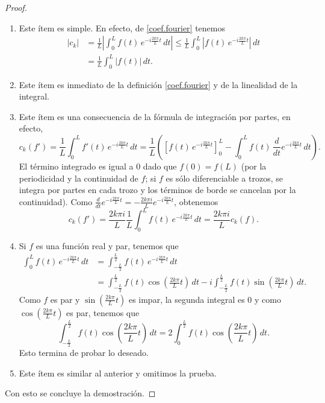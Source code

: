 \documentclass[12pt, a4paper]{amsbook}
\theoremstyle{remark}
\theoremstyle{definition}
\numberwithin{section}{chapter}
\numberwithin{subsection}{section}
\numberwithin{equation}{section}
\numberwithin{figure}{chapter}
\begin{document}
\begin{proof}
\begin{enumerate}
\item Este ítem es simple. En efecto, de \eqref{coef.fourier} tenemos
\begin{align*}
|c_k| &= \frac{1}{L}\left|\int_0^L f(t)\, e^{-i\frac{2k\pi}{L}t}\, dt \right|\le\frac{1}{L}\int_0^L \left|f(t)\, e^{-i\frac{2k\pi}{L}t}\right|\, dt \\
& = \frac{1}{L}\int_0^L |f(t)|\, dt.
\end{align*}

\item Este ítem es inmediato de la definición \eqref{coef.fourier} y de la linealidad de la integral.

\item Este ítem es una consecuencia de la fórmula de integración por partes, en efecto,
$$
c_k(f') = \frac{1}{L}\int_0^L f'(t)\, e^{-i\frac{2k\pi}{L}t}\, dt = \frac{1}{L}\left([f(t)\, e^{-i\frac{2k\pi}{L}t}]_0^L - \int_0^L f(t)\, \frac{d}{dt}e^{-i\frac{2k\pi}{L}t}\, dt\right).
$$
El término integrado es igual a 0 dado que $f(0)=f(L)$ (por la periodicidad y la continuidad de $f$; si $f$ es sólo diferenciable a trozos, se integra por partes en cada trozo y los términos de borde se cancelan por la continuidad). Como $\frac{d}{dt}e^{-i\frac{2k\pi}{L}t} = -\frac{2k\pi i}{L}e^{-i\frac{2k\pi}{L}t}$, obtenemos
$$
c_k(f') = \frac{2k\pi i}{L} \frac{1}{L}\int_0^L f(t)\, e^{-i\frac{2k\pi}{L}t}\, dt = \frac{2k\pi i}{L} c_k(f).
$$

\item Si $f$ es una función real y par, tenemos que
\begin{align*}
\int_0^L f(t)\, e^{-i\frac{2k\pi}{L}t}\, dt &= \int_{-\frac{L}{2}}^{\frac{L}{2}} f(t)\, e^{-i\frac{2k\pi}{L}t}\, dt\\
&=\int_{-\frac{L}{2}}^{\frac{L}{2}} f(t)\cos\left(\frac{2k\pi}{L}t\right)\, dt - i\int_{-\frac{L}{2}}^{\frac{L}{2}} f(t)\sin\left(\frac{2k\pi}{L}t\right)\, dt.
\end{align*}
Como $f$ es par y $\sin(\frac{2k\pi}{L}t)$ es impar, la segunda integral es 0 y como $\cos(\frac{2k\pi}{L}t)$ es par, tenemos que
$$
\int_{-\frac{L}{2}}^{\frac{L}{2}} f(t)\cos\left(\frac{2k\pi}{L}t\right)\, dt = 2\int_0^{\frac{L}{2}} f(t)\cos\left(\frac{2k\pi}{L}t\right)\, dt.
$$
Esto termina de probar lo deseado.

\item Este ítem es similar al anterior y omitimos la prueba.
\end{enumerate}
Con esto se concluye la demostración.
\end{proof}
\end{document}
